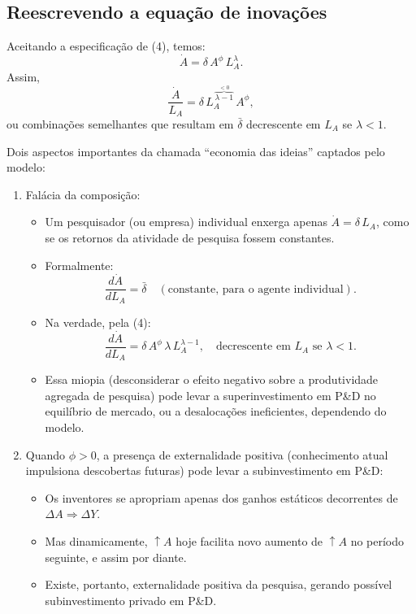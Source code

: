 \documentclass[a4paper,12pt]{article}[abntex2]
\begin{document}
\subsection{\textbf{Reescrevendo a equação de inovações}}
Aceitando a especificação de (4), temos:
\[
  \dot{A} = \delta\,A^\phi\,L_A^{\lambda}.
\]
Assim,
\[
  \frac{\dot{A}}{L_A}
  = 
  \delta\,L_A^{\,\overbrace{\lambda - 1}^{<0}}\,A^\phi,
\]
ou combinações semelhantes que resultam em $\bar{\delta}$ decrescente em $L_A$ se $\lambda < 1$.


Dois aspectos importantes da chamada ``economia das ideias'' captados pelo modelo:
\begin{enumerate}
    \item Falácia da composição:
          \begin{itemize}
            \item Um pesquisador (ou empresa) individual enxerga apenas 
                  $\dot{A} = \delta\,L_A$, 
                  como se os retornos da atividade de pesquisa fossem constantes.
            \item Formalmente: 
              \[
                \frac{d\dot{A}}{dL_A}
                = 
                \bar{\delta}
                \quad(\text{constante, para o agente individual}).
              \]
            \item Na verdade, pela (4):
              \[
                \frac{d\dot{A}}{dL_A}
                = 
                \delta\,A^\phi\,\lambda\,L_A^{\lambda - 1},
                \quad
                \text{decrescente em } L_A \text{ se } \lambda<1.
              \]
            \item Essa miopia (desconsiderar o efeito negativo sobre 
                  a produtividade agregada de pesquisa) pode levar 
                  a superinvestimento em P\&D no equilíbrio de mercado, 
                  ou a desalocações ineficientes, dependendo do modelo.
          \end{itemize}

    \item Quando $\phi > 0$, a presença de externalidade positiva 
          (conhecimento atual impulsiona descobertas futuras) 
          pode levar a subinvestimento em P\&D:
          \begin{itemize}
            \item Os inventores se apropriam apenas dos ganhos estáticos 
                  decorrentes de $\Delta A \Rightarrow \Delta Y$.
            \item Mas dinamicamente, $\uparrow A$ hoje facilita novo aumento de $\uparrow A$ 
                  no período seguinte, e assim por diante.
            \item Existe, portanto, externalidade positiva da pesquisa, 
                  gerando possível subinvestimento privado em P\&D.
          \end{itemize}
\end{enumerate}
\end{document}
